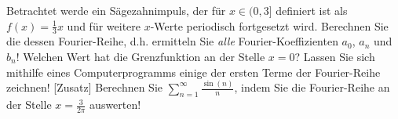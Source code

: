 \item Betrachtet werde ein Sägezahnimpuls, der für $x\in(0, 3]$ definiert ist als $f(x) = \frac{1}{3}x$ und für weitere $x$-Werte periodisch fortgesetzt wird. Berechnen Sie die dessen Fourier-Reihe, d.h. ermitteln Sie \emph{alle} Fourier-Koeffizienten $a_0$, $a_n$ und $b_n$! Welchen Wert hat die Grenzfunktion an der Stelle $x=0$? Lassen Sie sich mithilfe eines Computerprogramms einige der ersten Terme der Fourier-Reihe zeichnen! [Zusatz] Berechnen Sie $\sum_{n=1}^\infty \frac{\sin(n)}{n}$, indem Sie die Fourier-Reihe an der Stelle $x=\frac{3}{2\pi}$ auswerten!
